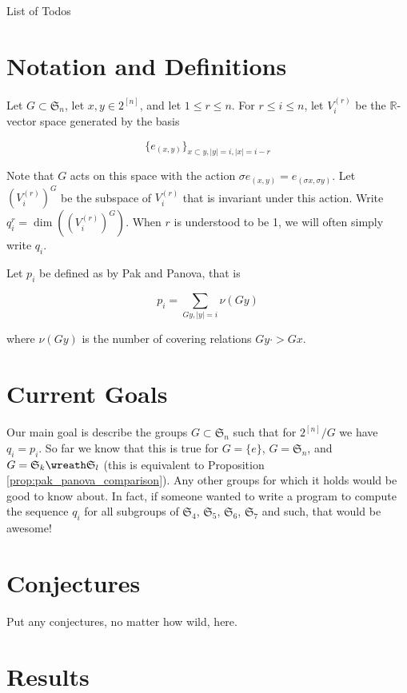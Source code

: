 \documentclass[11pt]{amsart}
\makeatletter
\theoremstyle{definition}
\def\listtodoname{List of Todos}
\def\listoftodos{\@starttoc{tdo}\listtodoname}
\makeatother
\begin{document}
\listoftodos
\newpage


\section{Notation and Definitions}

Let $G\subset \mathfrak{S}_n$, let $x,y\in 2^{[n]}$, and let $1\le r\le n$.  For $r\le i\le n$, let $V_i^{(r)}$ be the $\mathbb{R}$-vector space generated by the basis

$$\{e_{(x,y)}\}_{x\subset y, |y| = i, |x| = i-r}$$

Note that $G$ acts on this space with the action $\sigma e_{(x,y)} = e_{(\sigma x,\sigma y)}$.  Let $\left(V_i^{(r)}\right)^G$ be the subspace of $V_i^{(r)}$ that is invariant under this action.  Write $q_i^r = \dim\left(\left(V_i^{(r)}\right)^G\right)$.  When $r$ is understood to be 1, we will often simply write $q_i$.

Let $p_i$ be defined as by Pak and Panova, that is

$$p_i = \sum_{Gy, |y| = i} \nu(Gy)$$

where $\nu(Gy)$ is the number of covering relations $Gy \cdot> Gx$.




\section{Current Goals}
Our main goal is describe the groups $G\subset \mathfrak{S}_n$ such that for $2^{[n]}/G$ we have $q_i = p_i$.  So far we know that this is true for $G = \{e\}$, $G = \mathfrak{S}_n$, and $G = \mathfrak{S}_k \wreath \mathfrak{S}_l$ (this is equivalent to Proposition \ref{prop:pak_panova_comparison}).  Any other groups for which it holds would be good to know about.  In fact, if someone wanted to write a program to compute the sequence $q_i$ for all subgroups of $\mathfrak{S}_4$, $\mathfrak{S}_5$, $\mathfrak{S}_6$, $\mathfrak{S}_7$ and such, that would be awesome!




\section{Conjectures}
Put any conjectures, no matter how wild, here.





\section{Results}
\end{document}
